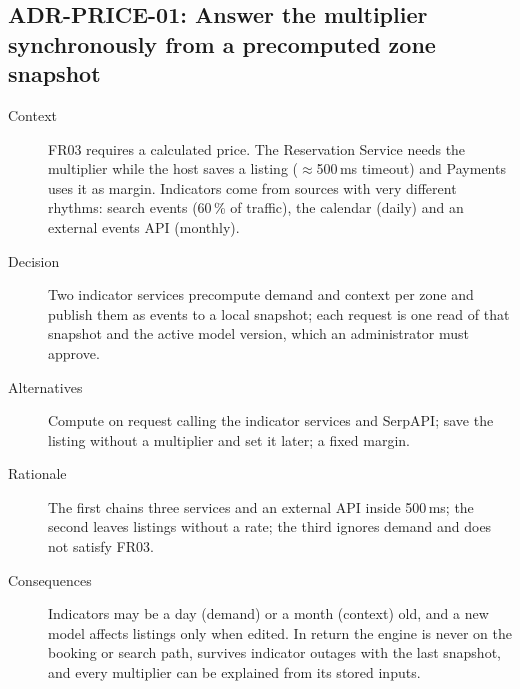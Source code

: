 \subsection{ADR-PRICE-01: Answer the multiplier synchronously from a precomputed zone snapshot}
\begin{description}
  \item[Context] FR03 requires a calculated price. The Reservation Service
    needs the multiplier while the host saves a listing ($\approx$500\,ms
    timeout) and Payments uses it as margin. Indicators come from sources with
    very different rhythms: search events (60\,\% of traffic), the calendar
    (daily) and an external events API (monthly).
  \item[Decision] Two indicator services precompute demand and context per
    zone and publish them as events to a local snapshot; each request is one
    read of that snapshot and the active model version, which an administrator
    must approve.
  \item[Alternatives] Compute on request calling the indicator services and
    SerpAPI; save the listing without a multiplier and set it later; a fixed
    margin.
  \item[Rationale] The first chains three services and an external API inside
    500\,ms; the second leaves listings without a rate; the third ignores
    demand and does not satisfy FR03.
  \item[Consequences] Indicators may be a day (demand) or a month (context)
    old, and a new model affects listings only when edited. In return the
    engine is never on the booking or search path, survives indicator outages
    with the last snapshot, and every multiplier can be explained from its
    stored inputs.
\end{description}

